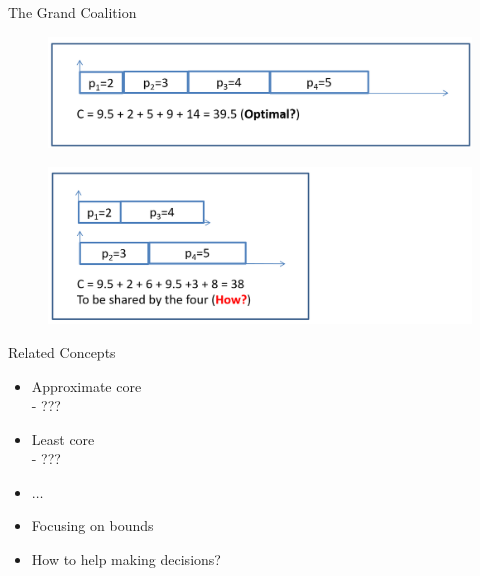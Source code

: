 \documentclass[14pt]{beamer}
\begin{document}
\begin{frame}{The Grand Coalition}

  \begin{figure}[H]
  \centering
  \includegraphics[width=1\textwidth]{Grand1.png}
  \end{figure}
  \centering

  \begin{figure}[htb]
  \includegraphics[width=1\textwidth]{Grand2.png}
  \end{figure}

\end{frame}


\begin{frame}{Related Concepts}
\begin{itemize}
\normalsize
\justifying
	\item Approximate core \\
  \vspace{0.25em}
  - ???
	\item Least core \\
  \vspace{0.25em}
  - ???
  \item $\ldots$\\
  \vspace{1em}
  \item Focusing on bounds
  \vspace{0.25em}
  \item How to help making decisions?

\end{itemize}
\end{frame}
\end{document}
